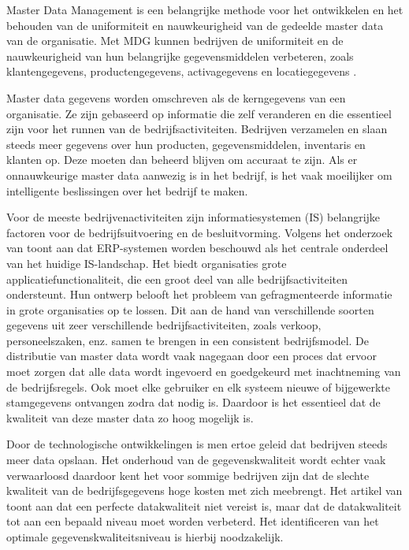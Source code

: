 Master Data Management is een belangrijke methode voor het ontwikkelen en het behouden van de uniformiteit en nauwkeurigheid van de gedeelde master data van de organisatie. Met MDG kunnen bedrijven de uniformiteit en de nauwkeurigheid van hun belangrijke gegevensmiddelen verbeteren, zoals klantengegevens, productengegevens, activagegevens en locatiegegevens \autocite{Foote2023}.

Master data gegevens worden omschreven als de kerngegevens van een organisatie. Ze zijn gebaseerd op informatie die zelf veranderen en die essentieel zijn voor het runnen van de bedrijfsactiviteiten. Bedrijven verzamelen en slaan steeds meer gegevens over hun producten, gegevensmiddelen, inventaris en klanten op. Deze moeten dan beheerd blijven om accuraat te zijn. Als er onnauwkeurige master data aanwezig is in het bedrijf, is het vaak moeilijker om intelligente beslissingen over het bedrijf te maken. 

Voor de meeste bedrijvenactiviteiten zijn informatiesystemen (IS) belangrijke factoren voor de bedrijfsuitvoering en de besluitvorming. Volgens het onderzoek van \textcite{Knolmayer2006} toont aan dat ERP-systemen worden beschouwd als het centrale onderdeel van het huidige IS-landschap. Het biedt organisaties grote applicatiefunctionaliteit, die een groot deel van alle bedrijfsactiviteiten ondersteunt. Hun ontwerp belooft het probleem van gefragmenteerde informatie in grote organisaties op te lossen. Dit aan de hand van verschillende soorten gegevens uit zeer verschillende bedrijfsactiviteiten, zoals verkoop, personeelszaken, enz. samen te brengen in een consistent bedrijfsmodel. De distributie van master data wordt vaak nagegaan door een proces dat ervoor moet zorgen dat alle data wordt ingevoerd en goedgekeurd met inachtneming van de bedrijfsregels. Ook moet elke gebruiker en elk systeem nieuwe of bijgewerkte stamgegevens ontvangen zodra dat nodig is. Daardoor is het essentieel dat de kwaliteit van deze master data zo hoog mogelijk is. 

Door de technologische ontwikkelingen is men ertoe geleid dat bedrijven steeds meer data opslaan. Het onderhoud van de gegevenskwaliteit wordt echter vaak verwaarloosd daardoor kent het voor sommige bedrijven zijn dat de slechte kwaliteit van de bedrijfsgegevens hoge kosten met zich meebrengt. Het artikel van \textcite{Haug2011} toont aan dat een perfecte datakwaliteit niet vereist is, maar dat de datakwaliteit tot aan een bepaald niveau moet worden verbeterd. Het identificeren van het optimale gegevenskwaliteitsniveau is hierbij noodzakelijk.

